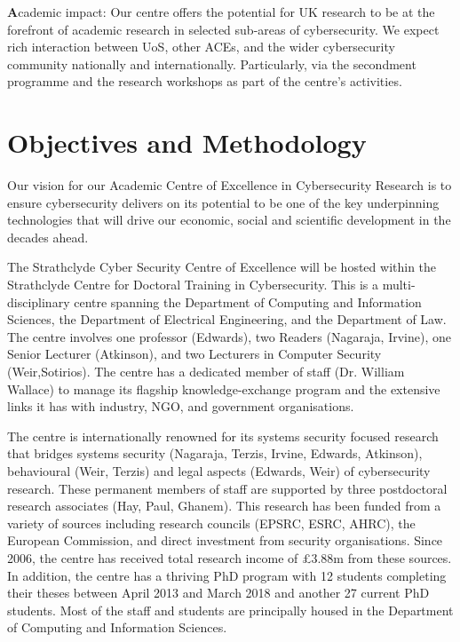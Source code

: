 \documentclass[11pt]{article}
\begin{document}
  {\textbf Academic impact:} Our centre offers the potential for UK
  research to be at the forefront of academic research in selected
  sub-areas of cybersecurity.  We expect rich interaction between UoS,
  other ACEs, and the wider cybersecurity community nationally and
  internationally. Particularly, via the secondment programme and the
  research workshops as part of the centre's activities.

\section{Objectives and Methodology}

Our vision for our Academic Centre of Excellence in Cybersecurity
Research is to ensure cybersecurity delivers on its potential to be
one of the key underpinning technologies that will drive our economic,
social and scientific development in the decades ahead.

The Strathclyde Cyber Security Centre of Excellence will be hosted within the Strathclyde Centre for Doctoral Training in Cybersecurity. This is a multi-disciplinary centre spanning the Department of Computing and Information Sciences, the Department of Electrical Engineering, and the Department of Law. The centre involves one professor (Edwards), two Readers (Nagaraja, Irvine), one Senior Lecturer (Atkinson), and two Lecturers in Computer Security (Weir,Sotirios). The centre has a dedicated member of staff (Dr. William Wallace) to manage its flagship knowledge-exchange program and the extensive links it has with industry, NGO, and government organisations.

The centre is internationally renowned for its systems security focused research that bridges systems security (Nagaraja, Terzis, Irvine, Edwards, Atkinson), behavioural (Weir, Terzis) and legal aspects (Edwards, Weir) of cybersecurity research. These permanent members of staff are supported by three postdoctoral research associates (Hay, Paul, Ghanem). This research has been funded from a variety of sources including research councils (EPSRC, ESRC, AHRC), the European Commission, and direct investment from security organisations. Since 2006, the centre has received total research income of £3.88m from these sources. In addition, the centre has a thriving PhD program with 12 students completing their theses between April 2013 and March 2018 and another 27 current PhD students. Most of the staff and students are principally housed in the Department of Computing and Information Sciences.
\end{document}
